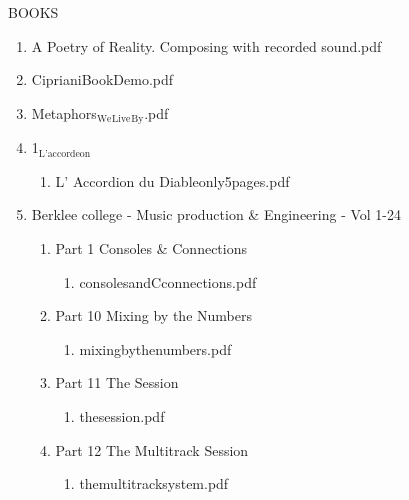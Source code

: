 \documentclass[11pt]{article}
\begin{document}
\item BOOKS
\label{sec-1-1-1-1-49-1-5}
\begin{enumerate}
\item A Poetry of Reality. Composing with recorded sound.pdf
\label{sec-1-1-1-1-49-1-5-1}

\item CiprianiBookDemo.pdf
\label{sec-1-1-1-1-49-1-5-2}

\item Metaphors$_{\text{We}}$$_{\text{Live}}$$_{\text{By}}$.pdf
\label{sec-1-1-1-1-49-1-5-3}

\item 1$_{\text{L'accordeon}}$
\label{sec-1-1-1-1-49-1-5-4}
\begin{enumerate}
\item L' Accordion du Diableonly5pages.pdf
\label{sec-1-1-1-1-49-1-5-4-1}
\end{enumerate}

\item Berklee college - Music production \& Engineering - Vol 1-24
\label{sec-1-1-1-1-49-1-5-5}
\begin{enumerate}
\item Part 1 Consoles \& Connections
\label{sec-1-1-1-1-49-1-5-5-1}
\begin{enumerate}
\item consolesandCconnections.pdf
\label{sec-1-1-1-1-49-1-5-5-1-1}
\end{enumerate}

\item Part 10 Mixing by the Numbers
\label{sec-1-1-1-1-49-1-5-5-2}
\begin{enumerate}
\item mixingbythenumbers.pdf
\label{sec-1-1-1-1-49-1-5-5-2-1}
\end{enumerate}

\item Part 11 The Session
\label{sec-1-1-1-1-49-1-5-5-3}
\begin{enumerate}
\item thesession.pdf
\label{sec-1-1-1-1-49-1-5-5-3-1}
\end{enumerate}

\item Part 12 The Multitrack Session
\label{sec-1-1-1-1-49-1-5-5-4}
\begin{enumerate}
\item themultitracksystem.pdf
\label{sec-1-1-1-1-49-1-5-5-4-1}
\end{enumerate}


\end{enumerate}
\end{enumerate}
\end{document}
